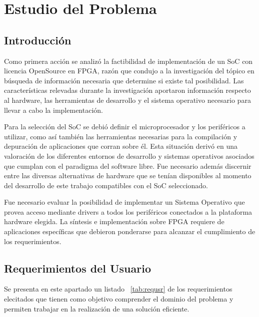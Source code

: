 \chapter{Estudio del Problema}
	
	\section{Introducción}
	\par
	Como primera acción se analizó la factibilidad de implementación de un SoC con licencia OpenSource en FPGA, razón que condujo a la investigación del
	tópico en búsqueda de información necesaria que determine si existe tal posibilidad. Las características relevadas durante la investigación
	aportaron información respecto al hardware, las herramientas de desarrollo y el sistema operativo necesario para llevar a cabo la implementación. 
	\vspace{0.5cm}
	\par
	Para la selección del SoC se debió definir el microprocesador y los periféricos a utilizar, como así también las herramientas necesarias para la
	compilación y depuración de aplicaciones que corran sobre él. Esta situación derivó en una valoración de los diferentes entornos de desarrollo y
	sistemas operativos asociados que cumplan con el paradigma del software libre. Fue necesario además discernir entre las diversas alternativas de
	hardware que se tenían disponibles al momento del desarrollo de este trabajo compatibles con el SoC seleccionado. 
	\vspace{0.5cm}
	\par
	Fue necesario evaluar la posibilidad de implementar un Sistema Operativo que provea acceso mediante drivers a todos los periféricos conectados a
	la plataforma hardware elegida. La síntesis e implementación sobre FPGA requiere de aplicaciones específicas que debieron ponderarse para alcanzar el
	cumplimiento de los requerimientos.
	
	\section{Requerimientos del Usuario}
	\par
	Se presenta en este apartado un listado ~\ref{tab:requsr} de los requerimientos elecitados que tienen como objetivo comprender el dominio del
	problema y permiten trabajar en la realización de una solución eficiente.
	
